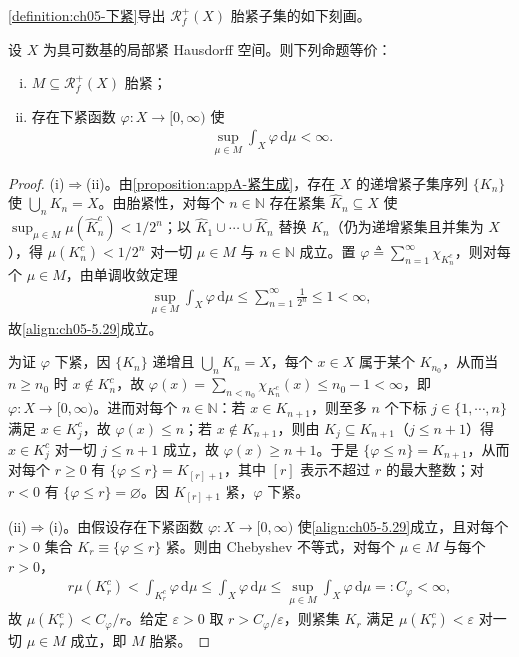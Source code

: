 \documentclass[../../main.tex]{subfiles}%
\begin{document}
\cref{definition:ch05-下紧}导出 $\mathscr{R}^+_f(X)$ 胎紧子集的如下刻画。

\begin{proposition}\label{proposition:ch05-胎紧判据}
设 $X$ 为具可数基的局部紧 Hausdorff 空间。则下列命题等价：
\begin{enumerate}[(i)]
\item\label{item:ch05-tight-i} $M\subseteq\mathscr{R}^+_f(X)$ 胎紧；
\item\label{item:ch05-tight-ii} 存在下紧函数 $\varphi:X\to[0,\infty)$ 使
\begin{align}
\sup_{\mu\in M}\int_X\varphi\,\mathrm{d}\mu<\infty.\label{align:ch05-5.29}
\end{align}
\end{enumerate}
\end{proposition}

\begin{proof}
(i)$\Rightarrow$(ii)。由\cref{proposition:appA-紧生成}，存在 $X$ 的递增紧子集序列 $\{K_n\}$ 使 $\bigcup_nK_n=X$。由胎紧性，对每个 $n\in\mathbb{N}$ 存在紧集 $\widehat K_n\subseteq X$ 使 $\sup_{\mu\in M}\mu(\widehat K_n^c)<1/2^n$；以 $\widehat K_1\cup\cdots\cup\widehat K_n$ 替换 $K_n$（仍为递增紧集且并集为 $X$），得 $\mu(K_n^c)<1/2^n$ 对一切 $\mu\in M$ 与 $n\in\mathbb{N}$ 成立。置 $\varphi\triangleq \sum_{n=1}^\infty\chi_{K_n^c}$，则对每个 $\mu\in M$，由单调收敛定理
\begin{align*}
\sup_{\mu\in M}\int_X\varphi\,\mathrm{d}\mu
\leqslant\sum_{n=1}^\infty\frac{1}{2^n}\leqslant1<\infty,
\end{align*}
故\eqref{align:ch05-5.29}成立。

为证 $\varphi$ 下紧，因 $\{K_n\}$ 递增且 $\bigcup_nK_n=X$，每个 $x\in X$ 属于某个 $K_{n_0}$，从而当 $n\geqslant n_0$ 时 $x\notin K_n^c$，故 $\varphi(x)=\sum_{n<n_0}\chi_{K_n^c}(x)\leqslant n_0-1<\infty$，即 $\varphi:X\to[0,\infty)$。进而对每个 $n\in\mathbb{N}$：若 $x\in K_{n+1}$，则至多 $n$ 个下标 $j\in\{1,\cdots ,n\}$ 满足 $x\in K_j^c$，故 $\varphi(x)\leqslant n$；若 $x\notin K_{n+1}$，则由 $K_j\subseteq K_{n+1}$（$j\leqslant n+1$）得 $x\in K_j^c$ 对一切 $j\leqslant n+1$ 成立，故 $\varphi(x)\geqslant n+1$。于是 $\{\varphi\leqslant n\}=K_{n+1}$，从而对每个 $r\geqslant0$ 有 $\{\varphi\leqslant r\}=K_{[r]+1}$，其中 $[r]$ 表示不超过 $r$ 的最大整数；对 $r<0$ 有 $\{\varphi\leqslant r\}=\varnothing$。因 $K_{[r]+1}$ 紧，$\varphi$ 下紧。

(ii)$\Rightarrow$(i)。由假设存在下紧函数 $\varphi:X\to[0,\infty)$ 使\eqref{align:ch05-5.29}成立，且对每个 $r>0$ 集合 $K_r\equiv\{\varphi\leqslant r\}$ 紧。则由 Chebyshev 不等式，对每个 $\mu\in M$ 与每个 $r>0$，
\begin{align*}
r\mu(K_r^c)<\int_{K_r^c}\varphi\,\mathrm{d}\mu
\leqslant\int_X\varphi\,\mathrm{d}\mu
\leqslant\sup_{\mu\in M}\int_X\varphi\,\mathrm{d}\mu=:C_\varphi<\infty,
\end{align*}
故 $\mu(K_r^c)<C_\varphi/r$。给定 $\varepsilon>0$ 取 $r>C_\varphi/\varepsilon$，则紧集 $K_r$ 满足 $\mu(K_r^c)<\varepsilon$ 对一切 $\mu\in M$ 成立，即 $M$ 胎紧。
\end{proof}
\end{document}
